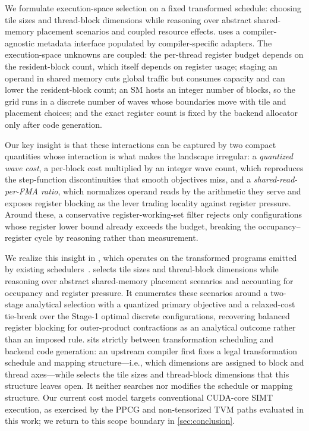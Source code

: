 We formulate execution-space selection on a fixed transformed schedule: choosing tile sizes and thread-block dimensions while reasoning over abstract shared-memory placement scenarios and coupled \gpu resource effects. \name uses a compiler-agnostic metadata interface populated by compiler-specific adapters. The execution-space unknowns are coupled: the per-thread register budget depends on the resident-block count, which itself depends on register usage; staging an operand in shared memory cuts global traffic but consumes capacity and can lower the resident-block count; an SM hosts an integer number of blocks, so the grid runs in a discrete number of waves whose boundaries move with tile and placement choices; and the exact register count is fixed by the backend allocator only after code generation.

Our key insight is that these interactions can be captured by two compact quantities whose interaction is what makes the landscape irregular: a \emph{quantized wave cost}, a per-block cost multiplied by an integer wave count, which reproduces the step-function discontinuities that smooth objectives miss, and a \emph{shared-read-per-FMA ratio}, which normalizes operand reads by the arithmetic they serve and exposes register blocking as the lever trading locality against register pressure. Around these, a conservative register-working-set filter rejects only configurations whose register lower bound already exceeds the budget, breaking the occupancy--register cycle by reasoning rather than measurement.

We realize this insight in \name, which operates on the transformed programs emitted by existing schedulers~\cite{ppcg,tvm}. \name selects tile sizes and thread-block dimensions while reasoning over abstract shared-memory placement scenarios and accounting for occupancy and register pressure. It enumerates these scenarios around a two-stage analytical selection with a quantized primary objective and a relaxed-cost tie-break over the Stage-1 optimal discrete configurations, recovering balanced register blocking for outer-product contractions as an analytical outcome rather than an imposed rule. \name sits strictly between transformation scheduling and backend code generation: an upstream compiler first fixes a legal transformation schedule and mapping structure---i.e., which dimensions are assigned to block and thread axes---while \name selects the tile sizes and thread-block dimensions that this structure leaves open. It neither searches nor modifies the schedule or mapping structure. Our current cost model targets conventional CUDA-core SIMT execution, as exercised by the PPCG and non-tensorized TVM paths evaluated in this work; we return to this scope boundary in \autoref{sec:conclusion}.

